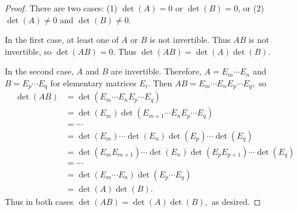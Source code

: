 \begin{proof}
    There are two cases: (1) $\det(A) = 0$ or $\det(B)=0$, or (2) $\det(A)\neq 0$ and $\det(B)\neq 0$.
    
    In the first case, at least one of $A$ or $B$ is not invertible. Thus $AB$ is not invertible, so $\det(AB) = 0.$ Thus $\det(AB) = \det(A)\det(B)$.

    In the second case, $A$ and $B$ are invertible. Therefore, $A=E_m\cdots E_n$ and $B=E_p\cdots E_q$ for elementary matrices $E_i.$ Then $AB=E_m\cdots E_nE_p\cdots E_q,$ so
    \begin{align*}
        \det(AB) &= \det(E_m\cdots E_nE_p\cdots E_q) \\
        &= \det(E_m)\det(E_{m+1}\cdots E_nE_p\cdots E_q) \\
        &= \cdots \\
        &= \det(E_m)\cdots\det(E_n)\det(E_p)\cdots\det(E_q) \\
        &= \det(E_mE_{m+1})\cdots\det(E_n)\det(E_pE_{p+1})\cdots\det(E_q) \\
        &= \cdots \\
        &= \det(E_m\cdots E_n)\det(E_p\cdots E_q) \\
        &= \det(A)\det(B).
    \end{align*}
    Thus in both cases $\det(AB) = \det(A)\det(B),$ as desired.
\end{proof}